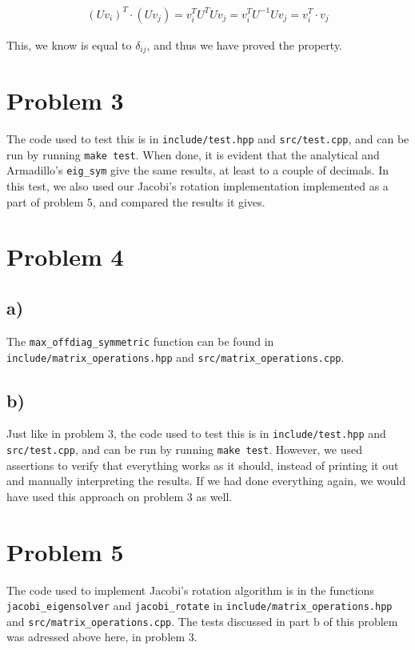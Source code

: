 \documentclass[english,notitlepage]{revtex4-1}  %
\begin{document}
\begin{align*}
\left(U v_i \right)^T \cdot (U v_j) = v_i^T U^T U v_j = v_i^T U^{-1} U v_j = v_i^T \cdot v_j
\end{align*}

This, we know is equal to $\delta_{ij}$, and thus we have proved the property.

\section*{Problem 3}

The code used to test this is in \lstinline{include/test.hpp} and \lstinline{src/test.cpp}, and can be run by running \lstinline{make test}. When done, it is evident that the analytical and Armadillo's \lstinline{eig_sym} give the same results, at least to a couple of decimals. In this test, we also used our Jacobi's rotation implementation implemented as a part of problem 5, and compared the results it gives.

\section*{Problem 4}

\subsection*{a)}
The \lstinline{max_offdiag_symmetric} function can be found in \lstinline{include/matrix_operations.hpp} and \lstinline{src/matrix_operations.cpp}.

\subsection*{b)}
Just like in problem 3, the code used to test this is in \lstinline{include/test.hpp} and \lstinline{src/test.cpp}, and can be run by running \lstinline{make test}. However, we used assertions to verify that everything works as it should, instead of printing it out and manually interpreting the results. If we had done everything again, we would have used this approach on problem 3 as well.

\section*{Problem 5}
The code used to implement Jacobi's rotation algorithm is in the functions \lstinline{jacobi_eigensolver} and \lstinline{jacobi_rotate} in \lstinline{include/matrix_operations.hpp} and \lstinline{src/matrix_operations.cpp}. The tests discussed in part b of this problem was adressed above here, in problem 3.
\end{document}
